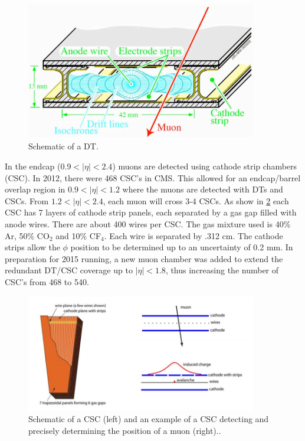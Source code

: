 \documentclass[oneside, letterpaper, oldfontcommands]{memoir}
\begin{document}
\begin{figure}[here]
\includegraphics[width=0.9\textwidth]{drift_tube.png}
\caption{Schematic of a DT\cite{1748-0221-3-08-S08001}.}
\label{fig:drift_tube}
\end{figure}

\qquad In the endcap ($ 0.9 < |\eta| < 2.4$) muons are detected using cathode strip chambers (CSC). In 2012, there were 468 CSC's in CMS. This allowed for an endcap/barrel overlap region in $0.9 < |\eta| < 1.2$ where the muons are detected with DTs and CSCs. From $1.2 < |\eta| < 2.4$, each muon will cross 3-4 CSCs. As show in \ref{fig:muoncsc} each CSC has 7 layers of cathode strip panels, each separated by a gas gap filled with anode wires. There are about 400 wires per CSC. The gas mixture used is 40\% Ar, 50\% CO$_{2}$ and 10\% CF$_{4}$. Each wire is separated by .312 cm. The cathode strips allow the $\phi$ position to be determined up to an uncertainty of 0.2 mm\cite{Collaboration:1355706}. In preparation for 2015 running, a new muon chamber was added to extend the redundant DT/CSC coverage up to $|\eta| < 1.8$, thus increasing the number of CSC's from 468 to 540. 

\begin{figure}[here]
\includegraphics[width=0.9\textwidth]{muoncsc.png}
\caption{Schematic of a CSC (left) and an example of a CSC detecting and precisely determining the position of a muon (right).\cite{1748-0221-3-08-S08001}.}
\label{fig:muoncsc}
\end{figure}
\end{document}
